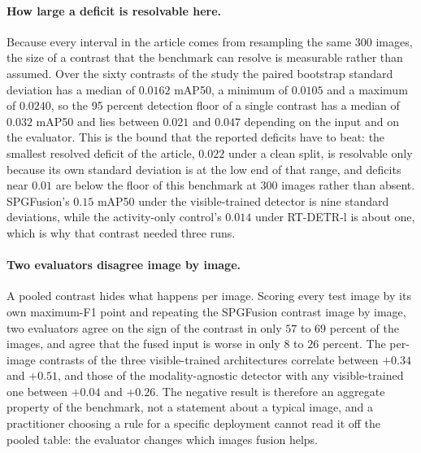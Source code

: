 \documentclass[journal]{IEEEtran}
\begin{document}
\begin{sloppypar}
\paragraph{How large a deficit is resolvable here.} Because every interval in the article
comes from resampling the same 300 images, the size of a contrast that the benchmark can
resolve is measurable rather than assumed. Over the sixty contrasts of the study the
paired bootstrap standard deviation has a median of $0.0162$ mAP50, a minimum of
$0.0105$ and a maximum of $0.0240$, so the 95 percent detection floor of a single
contrast has a median of $0.032$ mAP50 and lies between $0.021$ and $0.047$ depending
on the input and on the evaluator. This is the bound that the reported deficits have to
beat: the smallest resolved deficit of the article, $0.022$ under a clean split, is
resolvable only because its own standard deviation is at the low end of that range, and
deficits near $0.01$ are below the floor of this benchmark at 300 images rather than
absent. SPGFusion's $0.15$ mAP50 under the visible-trained detector is nine standard
deviations, while the activity-only control's $0.014$ under RT-DETR-l is about one,
which is why that contrast needed three runs.

\paragraph{Two evaluators disagree image by image.} A pooled contrast hides what
happens per image. Scoring every test image by its own maximum-F1 point and repeating
the SPGFusion contrast image by image, two evaluators agree on the sign of the contrast
in only $57$ to $69$ percent of the images, and agree that the fused input is worse in
only $8$ to $26$ percent. The per-image contrasts of the three visible-trained
architectures correlate between $+0.34$ and $+0.51$, and those of the modality-agnostic
detector with any visible-trained one between $+0.04$ and $+0.26$. The negative result
is therefore an aggregate property of the benchmark, not a statement about a typical
image, and a practitioner choosing a rule for a specific deployment cannot read it off
the pooled table: the evaluator changes which images fusion helps.


\end{sloppypar}
\end{document}
